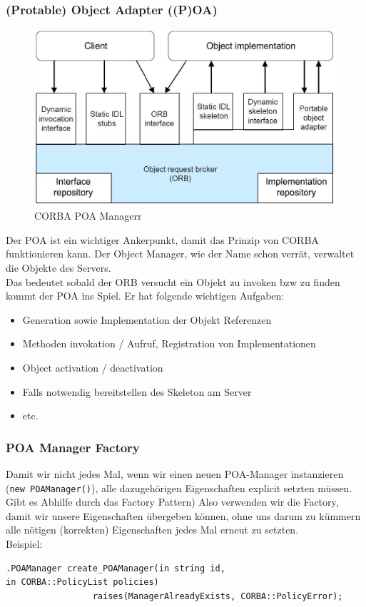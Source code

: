 			\clearpage
			
			\subsubsection{(Protable) Object Adapter ((P)OA)\cite{corbaPDF} \cite{poaWiki}}
			\begin{figure}[!h]
				\begin{center}
					\includegraphics[width=0.4\linewidth]{images/corba.jpg}
					\caption{CORBA POA Managerr \cite{corbaPDF}}
					\label{CORBA POA}
				\end{center}
			\end{figure}
			
			Der POA ist ein wichtiger Ankerpunkt, damit das Prinzip von CORBA funktionieren kann. Der Object Manager, wie der Name schon verrät, verwaltet die Objekte des Servers.\\
			Das bedeutet sobald der ORB versucht ein Objekt zu invoken bzw zu finden kommt der POA ins Spiel. Er hat folgende wichtigen Aufgaben:
				\begin{itemize}
					\item Generation sowie Implementation der Objekt Referenzen
					\item Methoden invokation / Aufruf, Registration von Implementationen
					\item Object activation / deactivation
					\item Falls notwendig bereitstellen des Skeleton am Server
					\item etc.
				\end{itemize}
				
			\subsubsection{POA Manager Factory}
			Damit wir nicht jedes Mal, wenn wir einen neuen POA-Manager instanzieren (\texttt{new POAManager()}), alle dazugehörigen Eigenschaften explicit setzten müssen. Gibt es Abhilfe durch das Factory Pattern) Also verwenden wir die Factory, damit wir unsere Eigenschaften übergeben können, ohne uns darum zu kümmern alle nötigen (korrekten) Eigenschaften jedes Mal erneut zu setzten.\\
			Beispiel:
			\begin{lstlisting}[style=C++, caption=IDL Example \cite{corbaPDF}]	
			.POAManager create_POAManager(in string id, in CORBA::PolicyList policies)
				 raises(ManagerAlreadyExists, CORBA::PolicyError);
			\end{lstlisting}
			\clearpage
	
